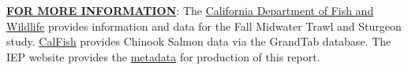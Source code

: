 \documentclass[]{article}\usepackage[]{graphicx}\usepackage[]{color}
\begin{document}
\begin{Row}
    \begin{Cell}{14}
      \textbf{\underline{FOR MORE INFORMATION}}: The  
			\href{https://www.wildlife.ca.gov/Regions/3}{California Department of Fish and Wildlife} provides information and 
			data for the Fall Midwater Trawl and Sturgeon study. 
			\href{http://www.calfish.org/ProgramsData/Species/CDFWAnadromousResourceAssessment.aspx}{CalFish} provides Chinook Salmon data via the GrandTab database. 
			The IEP website provides the 
			\href{https://water.ca.gov/-/media/DWR-Website/Web-Pages/Programs/Environmental-Services/Interagency-Ecological-Program/Files/Interagency-Ecological-Program-Status-and-Trends-Fall-2017.pdf}{metadata} 
			for production of this report.
    \end{Cell}
    \begin{Cell}{2}

    \end{Cell}
\end{Row}
\end{document}
